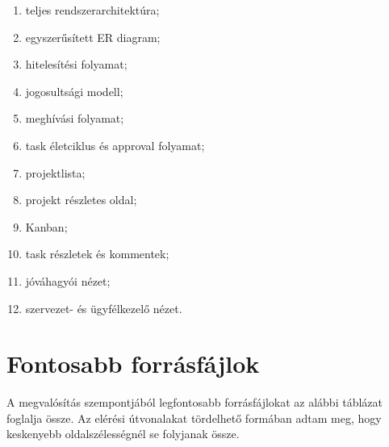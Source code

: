 \documentclass[11pt,a4paper]{report}
\begin{document}
    \begin{enumerate}
        \item teljes rendszerarchitektúra;
        \item egyszerűsített ER diagram;
        \item hitelesítési folyamat;
        \item jogosultsági modell;
        \item meghívási folyamat;
        \item task életciklus és approval folyamat;
        \item projektlista;
        \item projekt részletes oldal;
        \item Kanban;
        \item task részletek és kommentek;
        \item jóváhagyói nézet;
        \item szervezet- és ügyfélkezelő nézet.
    \end{enumerate}

    \chapter{Fontosabb forrásfájlok}

    A megvalósítás szempontjából legfontosabb forrásfájlokat az alábbi táblázat
    foglalja össze. Az elérési útvonalakat tördelhető formában adtam meg, hogy
    keskenyebb oldalszélességnél se folyjanak össze.
\end{document}
